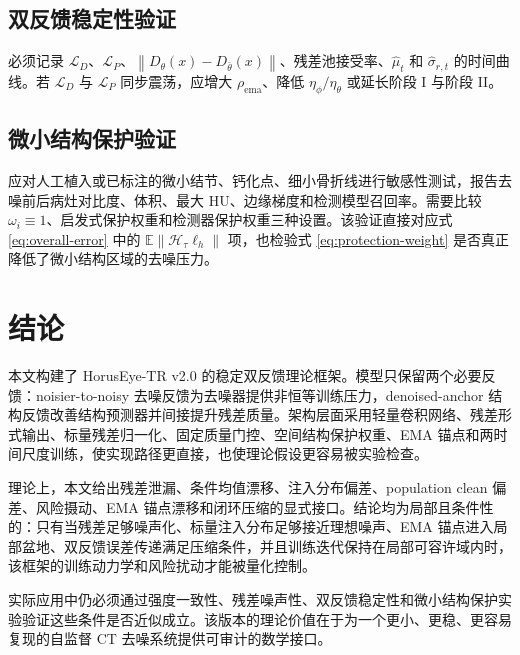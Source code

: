 \documentclass[11pt,a4paper,UTF8,fontset=fandol]{ctexart}
\theoremstyle{definition}
\newcommand{\norm}[1]{\left\lVert#1\right\rVert}
\newcommand{\E}{\mathbb{E}}
\newcommand{\cL}{\mathcal{L}}
\newcommand{\cH}{\mathcal{H}}
\begin{document}
\subsection{双反馈稳定性验证}

必须记录 $\cL_D$、$\cL_P$、$\norm{D_\theta(x)-D_{\bar\theta}(x)}$、残差池接受率、$\hat\mu_t$ 和 $\hat\sigma_{r,t}$ 的时间曲线。若 $\cL_D$ 与 $\cL_P$ 同步震荡，应增大 $\rho_{\mathrm{ema}}$、降低 $\eta_\phi/\eta_\theta$ 或延长阶段 I 与阶段 II。

\subsection{微小结构保护验证}

应对人工植入或已标注的微小结节、钙化点、细小骨折线进行敏感性测试，报告去噪前后病灶对比度、体积、最大 HU、边缘梯度和检测模型召回率。需要比较 $\omega_i\equiv1$、启发式保护权重和检测器保护权重三种设置。该验证直接对应式 \eqref{eq:overall-error} 中的 $\E\norm{\cH_\tau\ell_h}$ 项，也检验式 \eqref{eq:protection-weight} 是否真正降低了微小结构区域的去噪压力。

\section{结论}

本文构建了 HorusEye-TR v2.0 的稳定双反馈理论框架。模型只保留两个必要反馈：noisier-to-noisy 去噪反馈为去噪器提供非恒等训练压力，denoised-anchor 结构反馈改善结构预测器并间接提升残差质量。架构层面采用轻量卷积网络、残差形式输出、标量残差归一化、固定质量门控、空间结构保护权重、EMA 锚点和两时间尺度训练，使实现路径更直接，也使理论假设更容易被实验检查。

理论上，本文给出残差泄漏、条件均值漂移、注入分布偏差、population clean 偏差、风险摄动、EMA 锚点漂移和闭环压缩的显式接口。结论均为局部且条件性的：只有当残差足够噪声化、标量注入分布足够接近理想噪声、EMA 锚点进入局部盆地、双反馈误差传递满足压缩条件，并且训练迭代保持在局部可容许域内时，该框架的训练动力学和风险扰动才能被量化控制。

实际应用中仍必须通过强度一致性、残差噪声性、双反馈稳定性和微小结构保护实验验证这些条件是否近似成立。该版本的理论价值在于为一个更小、更稳、更容易复现的自监督 CT 去噪系统提供可审计的数学接口。
\end{document}
